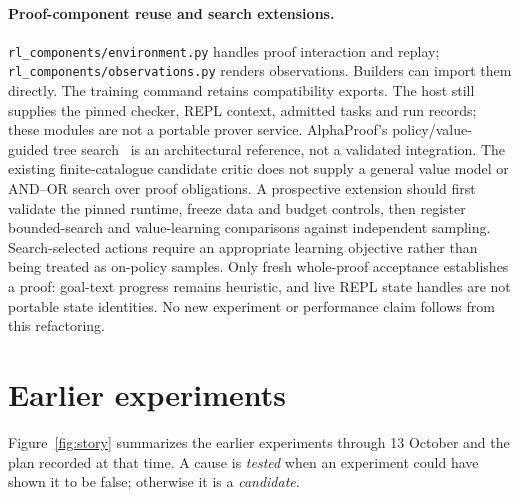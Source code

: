 \documentclass[11pt]{article}
\newcommand{\pth}[1]{\nolinkurl{#1}}
\begin{document}
\paragraph{Proof-component reuse and search extensions.}
\pth{rl_components/environment.py} handles proof interaction and replay; \pth{rl_components/observations.py} renders observations.
Builders can import them directly. The training command retains compatibility exports.
The host still supplies the pinned checker, REPL context, admitted tasks and run records; these modules are not a portable prover service.
AlphaProof's policy/value-guided tree search~\cite{alphaproof} is an architectural reference, not a validated integration.
The existing finite-catalogue candidate critic does not supply a general value model or AND--OR search over proof obligations.
A prospective extension should first validate the pinned runtime, freeze data and budget controls, then register bounded-search and value-learning comparisons against independent sampling.
Search-selected actions require an appropriate learning objective rather than being treated as on-policy samples.
Only fresh whole-proof acceptance establishes a proof: goal-text progress remains heuristic, and live REPL state handles are not portable state identities.
No new experiment or performance claim follows from this refactoring.

\clearpage
\section{Earlier experiments}
\label{sec:experiments}

Figure~\ref{fig:story} summarizes the earlier experiments through 13 October and the plan recorded at that time.
A cause is \emph{tested} when an experiment could have shown it to be false; otherwise it is a \emph{candidate}.
\end{document}
